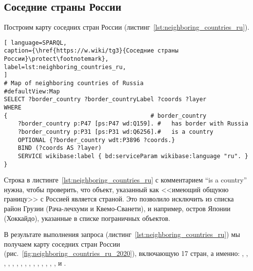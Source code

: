 \subsection{Соседние страны России}

Построим карту соседних стран России (листинг~\ref{lst:neighboring_countries_ru}).

\begin{lstlisting}[ language=SPARQL, 
caption={\href{https://w.wiki/tg3}{Соседние страны России}\protect\footnotemark},
label=lst:neighboring_countries_ru, 
]
# Map of neighboring countries of Russia
#defaultView:Map
SELECT ?border_country ?border_countryLabel ?coords ?layer
WHERE 
{                                         # border_country
	?border_country p:P47 [ps:P47 wd:Q159]. #   has border with Russia
	?border_country p:P31 [ps:P31 wd:Q6256].#   is a country
	OPTIONAL {?border_country wdt:P3896 ?coords.}
	BIND (?coords AS ?layer)
	SERVICE wikibase:label { bd:serviceParam wikibase:language "ru". }
}
\end{lstlisting}


Строка в листинге~\ref{lst:neighboring_countries_ru} с комментарием ``is a country'' нужна, чтобы проверить, что объект, указанный как <<имеющий общуюю границу>> с Россией является страной. Это позволило исключить из списка район Грузии (Рача-лечхуми и Квемо-Сванети), и например, остров Японии (Хоккайдо), указанные в списке пограничных объектов.

В результате выполнения запроса (листинг~\ref{lst:neighboring_countries_ru}) мы получаем карту соседних стран России (рис.~\ref{fig:neighboring_countries_ru_2020}), включающую 17 стран, а именно: , , , , , , , , , , , , , , ,  и .


\begin{figure*}[h]
	{
		\setlength{\fboxsep}{0pt}%
		\setlength{\fboxrule}{1pt}%
	}
	\caption{Карта соседних стран России, включающая 17 стран, 2021.
	}%
	\label{fig:neighboring_countries_ru_2020}%
\end{figure*}


